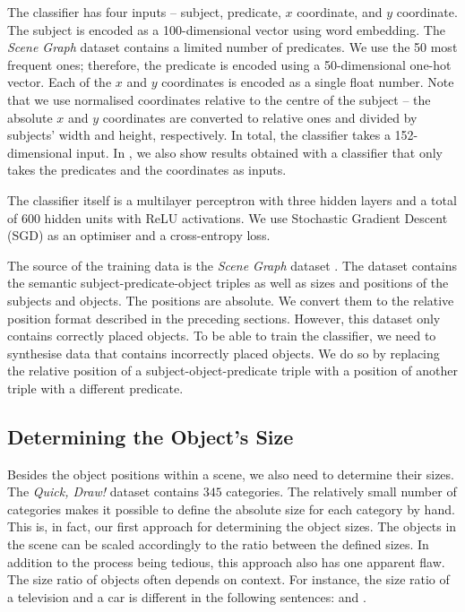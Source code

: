 \medskip

The classifier has four inputs -- subject, predicate, $x$ coordinate, and $y$ coordinate. The subject is encoded as a 100-dimensional vector using word embedding. The \emph{Scene Graph} dataset \citep{xu2017scenegraph} contains a limited number of predicates. We use the 50 most frequent ones; therefore, the predicate is encoded using a 50-dimensional one-hot vector. Each of the $x$ and $y$ coordinates is encoded as a single float number. Note that we use normalised coordinates relative to the centre of the subject -- the absolute $x$ and $y$ coordinates are converted to relative ones and divided by subjects' width and height, respectively.  In total, the classifier takes a 152-dimensional input. In , we also show results obtained with a classifier that only takes the predicates and the coordinates as inputs.

\medskip

The classifier itself is a multilayer perceptron with three hidden layers and a total of $600$ hidden units with ReLU activations. We use Stochastic Gradient Descent (SGD) as an optimiser and a cross-entropy loss.

\medskip

The source of the training data is the \emph{Scene Graph} dataset \citep{xu2017scenegraph}. The dataset contains the semantic subject-predicate-object triples as well as sizes and positions of the subjects and objects. The positions are absolute. We convert them to the relative position format described in the preceding sections. However, this dataset only contains correctly placed objects. To be able to train the classifier, we need to synthesise data that contains incorrectly placed objects. We do so by replacing the relative position of a subject-object-predicate triple with a position of another triple with a different predicate.

\subsection{Determining the Object's Size}
\label{sec:determining_obj_size}

Besides the object positions within a scene, we also need to determine their sizes. The \emph{Quick, Draw!} \citep{quickdraw} dataset contains $345$ categories. The relatively small number of categories makes it possible to define the absolute size for each category by hand. This is, in fact, our first approach for determining the object sizes. The objects in the scene can be scaled accordingly to the ratio between the defined sizes. In addition to the process being tedious, this approach also has one apparent flaw. The size ratio of objects often depends on context. For instance, the size ratio of a television and a car is different in the following sentences:  and .

